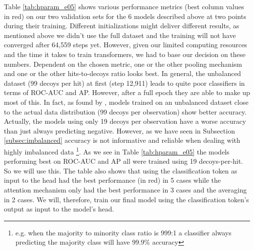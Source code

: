 \documentclass[msc,deptreport,ai]{infthesis} %
\begin{document}
		Table \ref{tab:hparam_e05} shows various performance metrics (best column values in red) on our two validation sets for the 6 models described above at two points during their training. Different initializations might deliver different results, as mentioned above we didn't use the full dataset and the training will not have converged after 64,559 steps yet. However, given our limited computing resources and the time it takes to train transformers, we had to base our decision on these numbers.  Dependent on the chosen metric, one or the other pooling mechanism and one or the other hits-to-decoys ratio  looks best. In general, the unbalanced dataset (99 decoys per hit) at first (step 12,911) leads to quite poor classifiers in terms of \gls{ROC}-\gls{AUC} and \gls{AP}. However, after a full epoch they are able to make up most of this. In fact, as found by \cite{weiss_learning_2003}, models trained on an unbalanced dataset close to the actual data distribution (99 decoys per observation) show better accuracy. Actually, the models using only 19 decoys per observation have a worse accuracy than just always predicting negative. However, as we have seen in Subsection \ref{subsec:imbalanced} accuracy is not informative and reliable when dealing with highly imbalanced data \footnote{e.g. when the majority to minority class ratio is 999:1 a classifier always predicting the majority class  will have 99.9\% accuracy}. As we see in Table \ref{tab:hparam_e05} the models performing best on \gls{ROC}-\gls{AUC} and \gls{AP} all were trained using 19 decoys-per-hit. So we will use this. The table also  shows that using the classification token as input to the head had the best performance (in red) in 5 cases while the attention mechanism only had the best performance in 3 cases and the averaging in 2 cases. We will, therefore, train our final  model using the classification token's output as input to the model's head.
		
\end{document}
